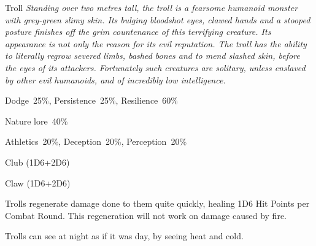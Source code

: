 \begin{monsterbox}{Troll}
	\textit{Standing over two metres tall, the troll is a fearsome humanoid monster with grey-green slimy skin. Its bulging bloodshot eyes, clawed hands and a stooped posture finishes off the grim countenance of this terrifying creature. Its appearance is not only the reason for its evil reputation. The troll has the ability to literally regrow severed limbs, bashed bones and to mend slashed skin, before the eyes of its attackers. Fortunately such creatures are solitary, unless enslaved by other evil humanoids, and of incredibly low intelligence.}\\
	\rpghline
	\basics[%
        hitpoints  = 23, 
	majorwound = 12,
	damagemodifier = +2D6,
	powerpoints = 11,
	movementrate = 23m,
	armor = Tough hide (3AP),
	plunderrating = 1
	]
	\rpghline%
	\stats[ %
		STR = 4D6+12 (26),
		CON = 3D6+9  (20),
		DEX = 2D6    (7),
		SIZ = 4D6+12 (26),
		INT = 1D6+3  (6),
		POW = 3D6    (11),
		CHA = 2D6    (7)
	]
	\rpghline%
	\begin{rpg-monsteraction}[Resistances]
		Dodge~25\%, Persistence~25\%, Resilience~60\%
	\end{rpg-monsteraction}
	\begin{rpg-monsteraction}[Knowledge]
    		Nature lore~40\%
	\end{rpg-monsteraction}
	\begin{rpg-monsteraction}[Practical]
		Athletics~20\%, Deception~20\%, Perception~20\%
	\end{rpg-monsteraction}
	\begin{rpg-monsteraction}
		Club (1D6+2D6)
	\end{rpg-monsteraction}
	\begin{rpg-monsteraction}
		Claw (1D6+2D6)
	\end{rpg-monsteraction}
	\begin{rpg-monsteraction}[Regeneration]
		Trolls regenerate damage done to them quite quickly, healing 1D6 Hit Points per Combat Round. This regeneration will not work on damage caused by fire.
	\end{rpg-monsteraction}
	\begin{rpg-monsteraction}[Thermoception]
		Trolls can see at night as if it was day, by seeing heat and cold.
	\end{rpg-monsteraction}

\end{monsterbox}

